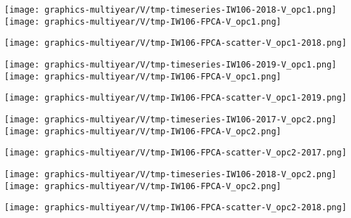 
\begin{center}
\begin{minipage}{7.0in}
\texttt{[image: graphics-multiyear/V/tmp-timeseries-IW106-2018-V\_opc1.png]}
\quad
\texttt{[image: graphics-multiyear/V/tmp-IW106-FPCA-V\_opc1.png]}
\vskip 1.0cm
\begin{center}
\texttt{[image: graphics-multiyear/V/tmp-IW106-FPCA-scatter-V\_opc1-2018.png]}
\end{center}
\end{minipage}
\end{center}


\begin{center}
\begin{minipage}{7.0in}
\texttt{[image: graphics-multiyear/V/tmp-timeseries-IW106-2019-V\_opc1.png]}
\quad
\texttt{[image: graphics-multiyear/V/tmp-IW106-FPCA-V\_opc1.png]}
\vskip 1.0cm
\begin{center}
\texttt{[image: graphics-multiyear/V/tmp-IW106-FPCA-scatter-V\_opc1-2019.png]}
\end{center}
\end{minipage}
\end{center}


\begin{center}
\begin{minipage}{7.0in}
\texttt{[image: graphics-multiyear/V/tmp-timeseries-IW106-2017-V\_opc2.png]}
\quad
\texttt{[image: graphics-multiyear/V/tmp-IW106-FPCA-V\_opc2.png]}
\vskip 1.0cm
\begin{center}
\texttt{[image: graphics-multiyear/V/tmp-IW106-FPCA-scatter-V\_opc2-2017.png]}
\end{center}
\end{minipage}
\end{center}


\begin{center}
\begin{minipage}{7.0in}
\texttt{[image: graphics-multiyear/V/tmp-timeseries-IW106-2018-V\_opc2.png]}
\quad
\texttt{[image: graphics-multiyear/V/tmp-IW106-FPCA-V\_opc2.png]}
\vskip 1.0cm
\begin{center}
\texttt{[image: graphics-multiyear/V/tmp-IW106-FPCA-scatter-V\_opc2-2018.png]}
\end{center}
\end{minipage}
\end{center}

